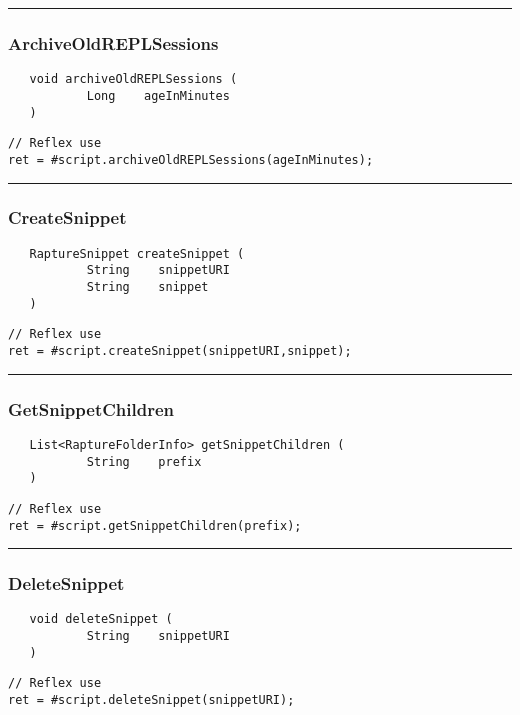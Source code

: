 \rule{15cm}{2pt}
\subsubsection{ArchiveOldREPLSessions}
\label{Api:ArchiveOldREPLSessions}
\begin{verbatim}
   void archiveOldREPLSessions (
           Long    ageInMinutes
   )
\end{verbatim}
\begin{lstlisting}[language=reflex]
// Reflex use
ret = #script.archiveOldREPLSessions(ageInMinutes);
\end{lstlisting}



\rule{15cm}{2pt}
\subsubsection{CreateSnippet}
\label{Api:CreateSnippet}
\begin{verbatim}
   RaptureSnippet createSnippet (
           String    snippetURI
           String    snippet
   )
\end{verbatim}
\begin{lstlisting}[language=reflex]
// Reflex use
ret = #script.createSnippet(snippetURI,snippet);
\end{lstlisting}



\rule{15cm}{2pt}
\subsubsection{GetSnippetChildren}
\label{Api:GetSnippetChildren}
\begin{verbatim}
   List<RaptureFolderInfo> getSnippetChildren (
           String    prefix
   )
\end{verbatim}
\begin{lstlisting}[language=reflex]
// Reflex use
ret = #script.getSnippetChildren(prefix);
\end{lstlisting}



\rule{15cm}{2pt}
\subsubsection{DeleteSnippet}
\label{Api:DeleteSnippet}
\begin{verbatim}
   void deleteSnippet (
           String    snippetURI
   )
\end{verbatim}
\begin{lstlisting}[language=reflex]
// Reflex use
ret = #script.deleteSnippet(snippetURI);
\end{lstlisting}



